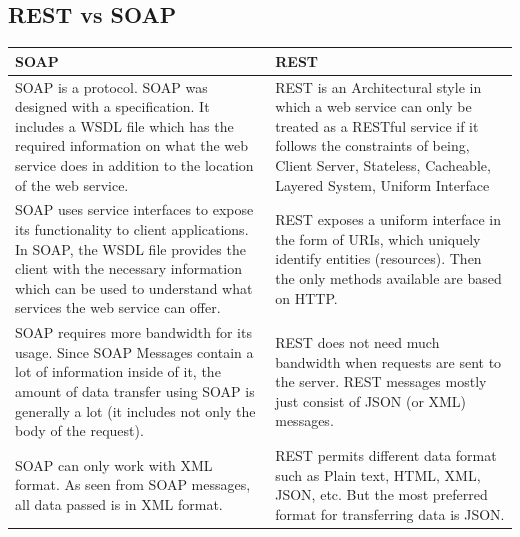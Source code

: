 \documentclass[10pt,a4paper]{article}
\begin{document}
\subsection{REST vs SOAP}
\begin{center}
\begin{tabular}{ | m{200pt} | m{200pt}| }
\hline
\textbf{SOAP} & \textbf{REST} \\
\hline
 SOAP is a protocol. SOAP was designed with a specification. It includes a WSDL file which has the required information on what the web service does in addition to the location of the web service. & REST is an Architectural style in which a web service can only be treated as a RESTful service if it follows the constraints of being, Client Server, Stateless, Cacheable, Layered System, Uniform Interface	\\ 
 \hline
 SOAP uses service interfaces to expose its functionality to client applications. In SOAP, the WSDL file provides the client with the necessary information which can be used to understand what services the web service can offer. & REST exposes a uniform interface in the form of URIs, which uniquely identify entities (resources). Then the only methods available are based on HTTP.\\
 \hline
 SOAP requires more bandwidth for its usage. Since SOAP Messages contain a lot of information inside of it, the amount of data transfer using SOAP is generally a lot (it includes not only the body of the request). & REST does not need much bandwidth when requests are sent to the server. REST messages mostly just consist of JSON (or XML) messages.   \\
 \hline 
 SOAP can only work with XML format. As seen from SOAP messages, all data passed is in XML format. & REST permits different data format such as Plain text, HTML, XML, JSON, etc. But the most preferred format for transferring data is JSON. \\
 \hline
\end{tabular}
\end{center}
\end{document}
